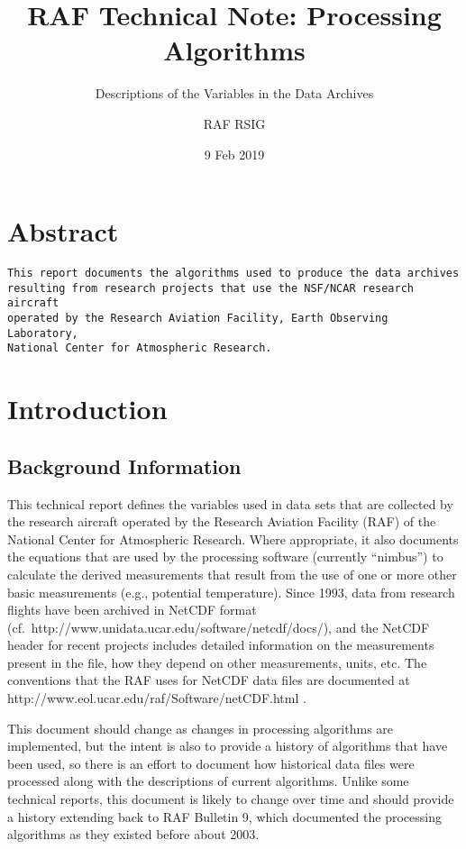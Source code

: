 \documentclass[
  english,
]{book}
\title{RAF Technical Note: Processing Algorithms}
\subtitle{Descriptions of the Variables in the Data Archives}
\author{RAF RSIG}
\date{9 Feb 2019}
\begin{document}
\maketitle

{
\setcounter{tocdepth}{1}
\tableofcontents
}
\hypertarget{index}{%
\chapter*{Abstract}\label{index}}

\begin{verbatim}
This report documents the algorithms used to produce the data archives 
resulting from research projects that use the NSF/NCAR research aircraft 
operated by the Research Aviation Facility, Earth Observing Laboratory, 
National Center for Atmospheric Research. 
\end{verbatim}

\hypertarget{introduction}{%
\chapter{Introduction}\label{introduction}}

\hypertarget{background-information}{%
\section{Background Information}\label{background-information}}

This technical report defines the variables used in data sets that are collected by the research aircraft operated by the Research Aviation Facility (RAF) of the National Center for Atmospheric Research. Where appropriate, it also documents the equations that are used by the processing software (currently ``nimbus'') to calculate the derived measurements that result from the use of one or more other basic measurements (e.g., potential temperature). Since 1993, data from research flights have been archived in NetCDF format (cf.~http://www.unidata.ucar.edu/software/netcdf/docs/), and the NetCDF header for recent projects includes detailed information on the measurements present in the file, how they depend on other measurements, units, etc. The conventions that the RAF uses for NetCDF data files are documented at http://www.eol.ucar.edu/raf/Software/netCDF.html .

This document should change as changes in processing algorithms are implemented, but the intent is also to provide a history of algorithms that have been used, so there is an effort to document how historical data files were processed along with the descriptions of current algorithms. Unlike some technical reports, this document is likely to change over time and should provide a history extending back to RAF Bulletin 9, which documented the processing algorithms as they existed before about 2003.
\end{document}
